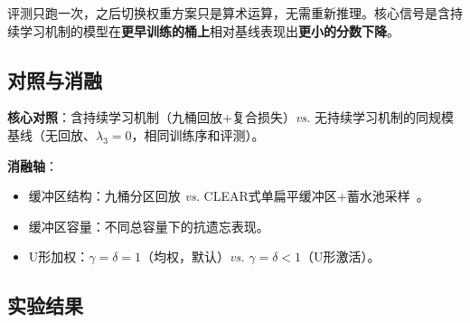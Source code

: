 评测只跑一次，之后切换权重方案只是算术运算，无需重新推理。核心信号是含持续学习机制的模型在\textbf{更早训练的桶上}相对基线表现出\textbf{更小的分数下降}。

\subsection{对照与消融}

\textbf{核心对照}：含持续学习机制（九桶回放+复合损失）\emph{vs.} 无持续学习机制的同规模基线（无回放、$\lambda_3=0$，相同训练序和评测）。

\textbf{消融轴}：
\begin{itemize}
  \item 缓冲区结构：九桶分区回放 \emph{vs.} CLEAR式单扁平缓冲区+蓄水池采样~\cite{A2}。
  \item 缓冲区容量：不同总容量下的抗遗忘表现。
  \item U形加权：$\gamma=\delta=1$（均权，默认）\emph{vs.} $\gamma=\delta<1$（U形激活）。
\end{itemize}

\subsection{实验结果}

